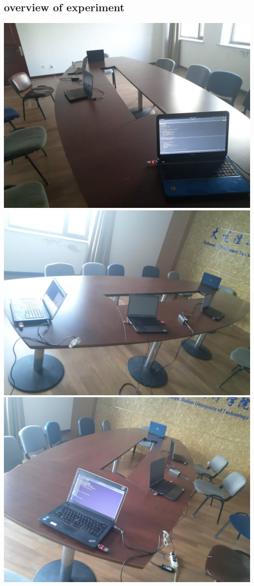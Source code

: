 \documentclass[12pt]{article}
\begin{document}
\begin{CJK}{UTF8}{gbsn}
\section{overview of experiment}
  \includegraphics[width=\textwidth]{./overview-from-server.jpg}
  \includegraphics[width=\textwidth]{./overview-from-side.jpg}
  \includegraphics[width=\textwidth]{./overview-from-endnode.jpg}

\end{CJK}
\end{document}
